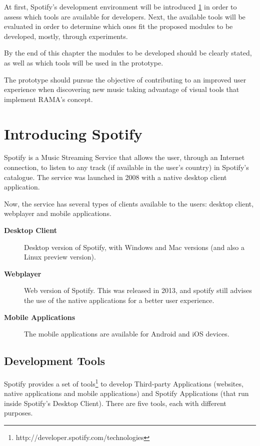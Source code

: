 At first, Spotify's development environment will be introduced \ref{sec:spotify} in order to assess which tools are available for developers.
Next, the available tools will be evaluated in order to determine which ones fit the proposed modules to be developed, mostly, through experiments. 

By the end of this chapter the modules to be developed should be clearly stated, as well as which tools will be used in the prototype.

The prototype should pursue the objective of contributing to an improved user experience when discovering new music taking advantage of visual tools that implement RAMA's concept.

\section{Introducing Spotify} %
\label{sec:spotify}

  Spotify is a Music Streaming Service that allows the user, through an Internet connection, to listen to any track (if available in the user's country) in Spotify's catalogue.
  The service was launched in 2008 with a native desktop client application.

  Now, the service has several types of clients available to the users: desktop client, webplayer and mobile applications.

  \begin{description}
    \item[\textbf{Desktop Client}] Desktop version of Spotify, with Windows and Mac versions (and also a Linux preview version).
    \item[\textbf{Webplayer}] Web version of Spotify. This was released in 2013, and spotify still advises the use of the native applications for a better user experience.
    \item[\textbf{Mobile Applications}] The mobile applications are available for Android and iOS devices.
  \end{description}

  \subsection{Development Tools} %
  \label{sub:devtools}
  
    Spotify provides a set of tools\footnote{http://developer.spotify.com/technologies} to develop Third-party Applications (websites, native applications and mobile applications) and Spotify Applications (that run inside Spotify's Desktop Client).
    There are five tools, each with different purposes.

